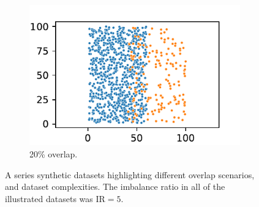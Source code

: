 \begin{figure}
\begin{subfigure}[b]{0.24\textwidth}
    \end{subfigure}
    \hfill
    \begin{subfigure}[b]{0.24\textwidth}  
        \centering 
        \includegraphics[width=\textwidth]{../plots/synthetic_dataset_visualizations/uniform_overlap_0.83_0.17_20_1000.csv.pdf}
        \caption[]%
        {{\small 20\% overlap.}}    
        \label{fig:uniform_overlap_20}
    \end{subfigure}
    \caption[]
    {\small A series synthetic datasets highlighting different overlap scenarios, and dataset complexities. The imbalance ratio in all of the illustrated datasets was $\text{IR}=5$.} 
    \label{fig:mean and std of nets}
\end{figure}


